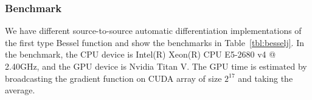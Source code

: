 \documentclass{article}
\newcommand{\<}{\langle}
\renewcommand{\>}{\rangle}
\newcommand{\Tbl}[1]{Table~\ref{#1}}
\newcommand{\ra}[1]{\renewcommand{\arraystretch}{#1}}
\newcommand{\blue}[1]{[{\bf  \color{blue}{JG: #1}}]}
\theoremstyle{definition}\newtheorem{definition}{\textit{Definition}}
\begin{document}
\subsubsection{Benchmark}
We have different source-to-source automatic differentiation implementations of the first type Bessel function and show the benchmarks in \Tbl{tbl:besselj}.
In the benchmark, the CPU device is Intel(R) Xeon(R) CPU E5-2680 v4 @ 2.40GHz, and the GPU device is Nvidia Titan V. The GPU time is estimated by broadcasting the gradient function on CUDA array of size $2^{17}$ and taking the average.
\begin{table}[h!]\centering
\begin{minipage}{0.8\columnwidth}
\ra{1.3}
    \caption{Time and space used for computing gradients of the first kind Bessel function $J_2(1.0)$.
    \blue{@MLS, Please fill the Tapenade benchmark here, and add some comments bellow.}
}\label{tbl:besselj}
\end{minipage}
\end{table}
\end{document}
